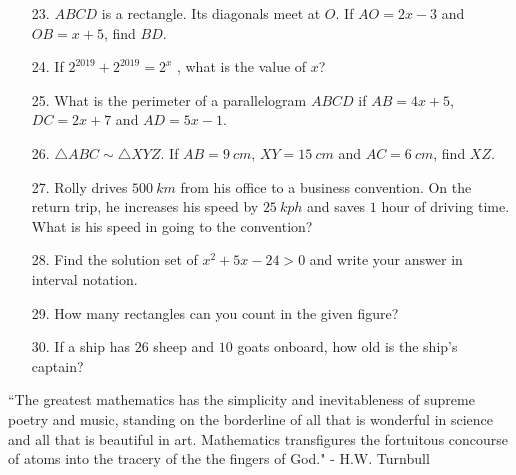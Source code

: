 \documentclass[12pt,letterpaper]{article}
\begin{document}
\begin{enumerate}
\item [\underline{\hspace{1.3cm}}23.]$ABCD$ is a rectangle. Its diagonals meet at $O$. If $AO=2x-3$ and $OB=x+5$, find $BD$.
\item [\underline{\hspace{1.3cm}}24.]If $2^{2019}+2^{2019}=2^x$ , what is the value of $x$?
\item [\underline{\hspace{1.3cm}}25.]What is the perimeter of a parallelogram $ABCD$ if $AB=4x+5$, $DC=2x+7$ and $AD=5x-1$.
\item [\underline{\hspace{1.3cm}}26.]$\triangle ABC \sim \triangle XYZ$. If $AB=9\ cm$, $XY=15\ cm$ and $AC=6\ cm$, find $XZ$.
\item [\underline{\hspace{1.3cm}}27.]Rolly drives $500\ km$ from his office to a business convention. On the return trip, he increases his speed by $25\ kph$ and saves $1$ hour of driving time. What is his speed in going to the convention?
\item [\underline{\hspace{1.3cm}}28.]Find the solution set of $x^2+5x-24>0$ and write your answer in interval notation.
\item [\underline{\hspace{1.3cm}}29.]How many rectangles can you count in the given figure?
\\
\begin{center}
\end{center}

\item [\underline{\hspace{1.3cm}}30.] If a ship has $26$ sheep and $10$ goats onboard, how old is the ship's captain?
 
\end{enumerate}


\vspace{1cm}
\begin{small}“The greatest mathematics has the simplicity and inevitableness of supreme poetry and music, standing on the borderline of all that is wonderful in science and all that is beautiful in art. Mathematics transfigures the fortuitous concourse of atoms into the tracery of the the fingers of God." - H.W. Turnbull
\end{small}
\end{document}
